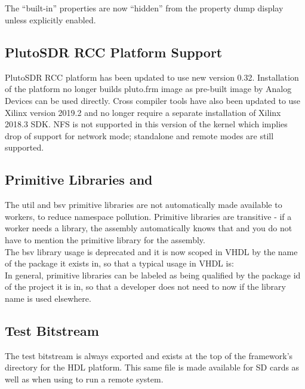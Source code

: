\subsection{}
\label{sec:20_ocpigen}
The ``built-in'' properties are now ``hidden'' from the property dump display unless explicitly enabled.

\subsection{PlutoSDR RCC Platform Support}
\label{sec:20_plutosdr}
PlutoSDR RCC platform has been updated to use new version 0.32. Installation of the platform no longer builds pluto.frm image as pre-built image by Analog Devices can be used directly. Cross compiler tools have also been updated to use Xilinx version 2019.2 and no longer require a separate installation of Xilinx 2018.3 SDK. NFS is not supported in this version of the kernel which implies drop of support for network mode; standalone and remote modes are still supported.

\subsection{Primitive Libraries  and }
\label{sec:20_util_bsv_library}
The util and bsv primitive libraries are not automatically made available to workers, to reduce namespace pollution. Primitive libraries are transitive - if a worker needs a library, the assembly automatically knows that and you do not have to mention the primitive library for the assembly.\\

The bsv library usage is deprecated and it is now scoped in VHDL by the name of the package it exists in, so that a typical usage in VHDL is: \\

In general, primitive libraries can be labeled as being qualified by the package id of the project it is in, so that a developer does not need to now if the library name is used elsewhere.

\subsection{Test Bitstream }
\label{sec:20_testbias}
The test bitstream  is always exported and exists at the top of the framework's directory for the HDL platform. This same file is made available for SD cards as well as when using  to run a remote system.

